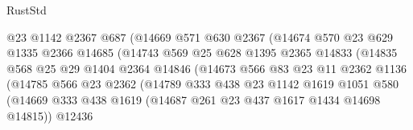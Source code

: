 \begin{lexlean}{RustStd}
\begin{coremodule}
                                  @23
                                  @1142
                                  @2367
                                  @687
                                  (@14669
                                    @571
                                    @630
                                    @2367
                                    (@14674
                                      @570
                                      @23
                                      @629
                                      @1335
                                      @2366
                                      @14685
                                      (@14743
                                        @569
                                        @25
                                        @628
                                        @1395
                                        @2365
                                        @14833
                                        (@14835
                                          @568
                                          @25
                                          @29
                                          @1404
                                          @2364
                                          @14846
                                          (@14673
                                            @566
                                            @83
                                            @23
                                            @11
                                            @2362
                                            @1136
                                            (@14785
                                              @566
                                              @23
                                              @2362
                                              (@14789
                                                @333
                                                @438
                                                @23
                                                @1142
                                                @1619
                                                @1051
                                                @580
                                                (@14669
                                                  @333
                                                  @438
                                                  @1619
                                                  (@14687 @261 @23 @437 @1617 @1434 @14698 @14815))
                                                @12436

\end{coremodule}
\end{lexlean}
